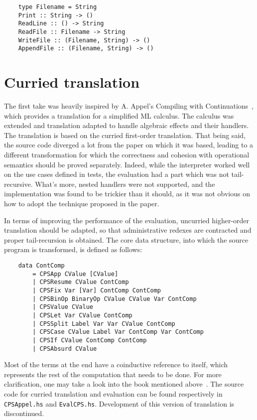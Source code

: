 \documentclass[declaration,shortabstract]{iithesis}
\theoremstyle{definition} \newtheorem{definition}{Definition}[chapter]
\theoremstyle{remark} \newtheorem{remark}[definition]{Observation}
\theoremstyle{plain} \newtheorem{theorem}[definition]{Theorem}
\theoremstyle{plain} \newtheorem{lemma}[definition]{Lemma}
\begin{document}
\begin{verbatim}
    type Filename = String
    Print :: String -> ()
    ReadLine :: () -> String
    ReadFile :: Filename -> String
    WriteFile :: (Filename, String) -> ()
    AppendFile :: (Filename, String) -> ()
\end{verbatim}

    \section{Curried translation}

    The first take was heavily inspired by A. Appel's Compiling with
    Continuations~\cite{appel-continuations}, which provides a translation for
    a simplified ML calculus. The calculus was extended and translation adapted to
    handle algebraic effects and their handlers. The translation is based on the curried
    first-order translation. That being said, the source code diverged a lot from the
    paper on which it was based, leading to a different transformation for which the
    correctness and cohesion with operational semantics should be proved separately.
    Indeed, while the interpreter worked well on the use cases defined in tests, the
    evaluation had a part which was not tail-recursive. What's more, nested handlers
    were not supported, and the implementation was found to be trickier than it should,
    as it was not obvious on how to adopt the technique proposed in the paper.

    In terms of improving the performance of the evaluation, uncurried higher-order
    translation should be adapted, so that administrative redexes are contracted
    and proper tail-recursion is obtained. The core data structure, into which the
    source program is transformed, is defined as follows:

\begin{verbatim}
    data ContComp
        = CPSApp CValue [CValue]
        | CPSResume CValue ContComp
        | CPSFix Var [Var] ContComp ContComp
        | CPSBinOp BinaryOp CValue CValue Var ContComp
        | CPSValue CValue
        | CPSLet Var CValue ContComp
        | CPSSplit Label Var Var CValue ContComp
        | CPSCase CValue Label Var ContComp Var ContComp
        | CPSIf CValue ContComp ContComp
        | CPSAbsurd CValue
\end{verbatim}
    Most of the terms at the end have a coinductive reference to itself, which
    represents the rest of the computation that needs to be done. For more
    clarification, one may take a look into the book mentioned
    above~\cite{appel-continuations}. The source code for curried translation and
    evaluation can be found respectively in \verb!CPSAppel.hs! and
    \verb!EvalCPS.hs!. Development of this version of translation is discontinued.
\end{document}
